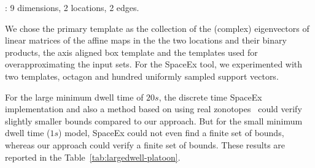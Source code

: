 : 9 dimensions, 2
locations, 2 edges.

  We chose the primary template
as the collection of the (complex) eigenvectors of linear matrices of
the affine maps in the the two locations and their binary products,
the axis aligned box template and the templates used for
overapproximating the input sets. For the SpaceEx tool, we
experimented with two templates, octagon and hundred uniformly sampled
support vectors.

  For the large minimum dwell time of $20s$, the
discrete time SpaceEx implementation and also a method based on using
real zonotopes~\cite{makhlouf2014networked} could verify slightly
smaller bounds compared to our approach.
But for the small minimum dwell time ($1s$) model, SpaceEx could not
even find a finite set of bounds, whereas our approach could verify a
finite set of bounds.  These results are reported in the
Table~\ref{tab:largedwell-platoon}.







